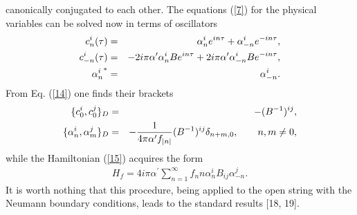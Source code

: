 \documentclass[a4paper]{article}
\begin{document}
canonically conjugated to each other. 
\newpage
The equations (\ref{7}) for the physical variables can be solved now 
in terms of oscillators 
\begin{eqnarray}\label{16}
c^i_n(\tau)&=&\alpha^i_ne^{in\tau}+\alpha^i_{-n}e^{-in\tau}, \cr
c^i_{-n}(\tau)&=&-2i\pi\alpha^\prime\alpha^i_nBe^{in\tau}+
2i\pi\alpha^\prime\alpha^i_{-n}Be^{-in\tau}, \cr
{\alpha^i_n}^* &=&\alpha^i_{-n}.
\end{eqnarray}
From Eq. (\ref{14}) one finds their brackets 
\begin{eqnarray}\label{17}
\{c_0^i, c_0^j\}_D&=&-(B^{-1})^{ij}, \cr
\{\alpha_n^i, \alpha_m^j\}_D&=&-\frac{1}{4\pi\alpha^\prime f_{\mid n\mid}}
(B^{-1})^{ij}\delta_{n+m,0}, \qquad n, m\ne 0, 
\end{eqnarray}
while the Hamiltonian (\ref{15}) acquires the form 
\begin{eqnarray}\label{18}
H_f=4i\pi\alpha^\prime\sum_{n=1}^\infty f_nn\alpha_n^iB_{ij}\alpha_{-n}^j.
\end{eqnarray}
It is worth nothing that this
procedure, being applied to the open string with the Neumann boundary
conditions, leads to the standard results [18, 19].
\end{document}
